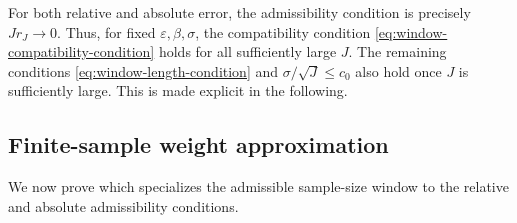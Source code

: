 \documentclass[10pt,dvipsnames]{amsart}
\begin{document}
For both relative and absolute error, the admissibility condition is precisely
\(
    Jr_J\longrightarrow0.
\)
Thus, for fixed \(\varepsilon,\beta,\sigma\), the compatibility condition
\eqref{eq:window-compatibility-condition} holds for all sufficiently large
\(J\). The remaining conditions
\eqref{eq:window-length-condition} and
\(\sigma/\sqrt J\leq c_0\) also hold once \(J\) is sufficiently large. This is made explicit in the following. 

\subsection{Finite-sample weight approximation}
\label{subsec:finite-sample-weight-approximation}

We now prove  which 
specializes the admissible sample-size window to the relative and
absolute admissibility conditions.
\end{document}
